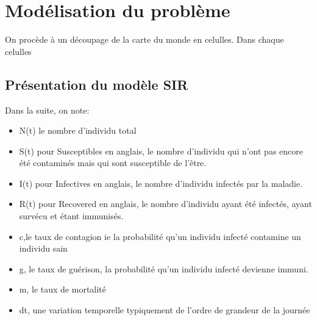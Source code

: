 \documentclass[12pt,a4paper]{report}
\begin{document}


\section*{Modélisation du problème}
\begin{flushleft}
	On procède à un découpage de la carte du monde en celulles. Dans chaque celulles 
\end{flushleft}

\subsection*{Présentation du modèle SIR}

\begin{flushleft}
	Dans la suite, on note:
\begin{itemize}
	\item{N(t) le nombre d'individu total}
	\item{S(t) pour Susceptibles en anglais, le nombre d'individu qui n'ont pas encore été contaminés mais qui sont susceptible de l'être.}
	\item{I(t) pour Infectives en anglais, le nombre d'individu infectés par la maladie.}
	\item{R(t) pour Recovered en anglais, le nombre d'individu ayant été infectés, ayant survécu et étant immunisés.}
	\item{c,le taux de contagion ie la probabilité qu'un individu infecté contamine un individu sain}
	\item{g, le taux de guérison, la probabilité qu'un individu infecté devienne immuni.}
	\item{m, le taux de mortalité}
	\item{dt, une variation temporelle typiquement de l'ordre de grandeur de la journée}
\end{itemize}
\end{flushleft}
\end{document}
